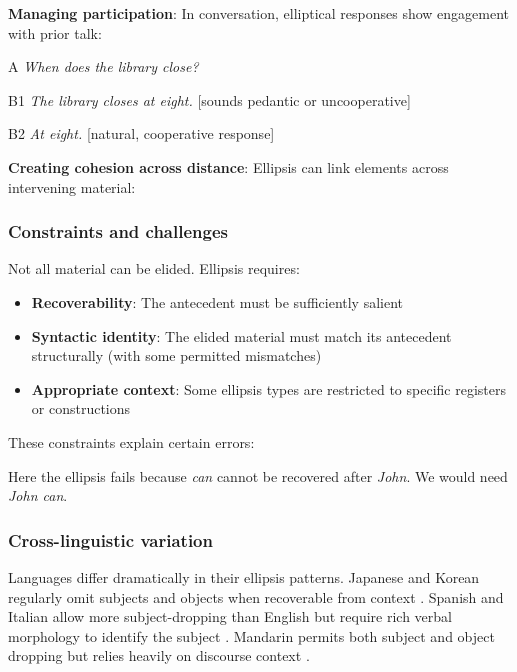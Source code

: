 \textbf{Managing participation}: In conversation, elliptical responses show engagement with prior talk:

\begin{dialogue}
\item[A] \textit{When does the library close?}
\item[B1] \textit{The library closes at eight.} \hfill [sounds pedantic or uncooperative]
\item[B2] \textit{At eight.} \hfill [natural, cooperative response]
\end{dialogue}

\textbf{Creating cohesion across distance}: Ellipsis can link elements across intervening material:

\z

\subsubsection*{Constraints and challenges}

Not all material can be elided. Ellipsis requires:
\begin{itemize}[noitemsep]
\item \textbf{Recoverability}: The antecedent must be sufficiently salient
\item \textbf{Syntactic identity}: The elided material must match its antecedent structurally (with some permitted mismatches)
\item \textbf{Appropriate context}: Some ellipsis types are restricted to specific registers or constructions
\end{itemize}

These constraints explain certain errors:

\z
Here the ellipsis fails because \textit{can} cannot be recovered after \textit{John}. We would need \textit{John can}.

\subsubsection*{Cross-linguistic variation}

Languages differ dramatically in their ellipsis patterns. Japanese and Korean regularly omit subjects and objects when recoverable from context \citep{Kuno1973}. Spanish and Italian allow more subject-dropping than English but require rich verbal morphology to identify the subject \citep{JaeggliSafir1989}. Mandarin permits both subject and object dropping but relies heavily on discourse context \citep{li_thompson_1979}.

